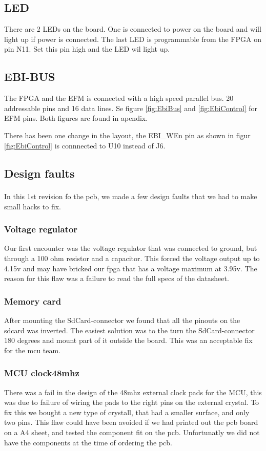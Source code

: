 \subsection{LED}
There are 2 LEDs on the board.
One is connected to power on the board and will light up if power is connected.
The last LED is programmable from the FPGA on pin N11.
Set this pin high and the LED wil light up.

\subsection{EBI-BUS}
The FPGA and the EFM is connected with a high speed parallel bus.
20 addressable pins and 16 data lines.
Se figure \ref{fig:EbiBus} and \ref{fig:EbiControl} for EFM pins.
Both figures are found in apendix.

There has been one change in the layout, the EBI\_WEn pin as shown in figur \ref{fig:EbiControl} is connnected to U10 instead of J6.

\subsection{Design faults}
In this 1\textsuperscript{}st revision fo the pcb, we made a few design faults that we had to make small hacks to fix.

\subsubsection{Voltage regulator}
Our first encounter was the voltage regulator that was connected to ground, but through a 100 ohm resistor and a capacitor.
This forced the voltage output up to 4.15v and may have bricked our fpga that has a voltage maximum at 3.95v.
The reason for this flaw was a failure to read the full specs of the datasheet.

\subsubsection{Memory card}
After mounting the SdCard-connector we found that all the pinouts on the sdcard was inverted.
The easiest solution was to the turn the SdCard-connector 180 degrees and mount part of it outside the board.
This was an acceptable fix for the mcu team.

\subsubsection{MCU clock48mhz}
There was a fail in the design of the 48mhz external clock pads for the MCU, this was due to failure of wiring the pads to the right pins on the external crystal.
To fix this we bought a new type of crystall, that had a smaller surface, and only two pins.
This flaw could have been avoided if we had printed out the pcb board on a A4 sheet, and tested the component fit on the pcb.
Unfortunatly we did not have the components at the time of ordering the pcb.

